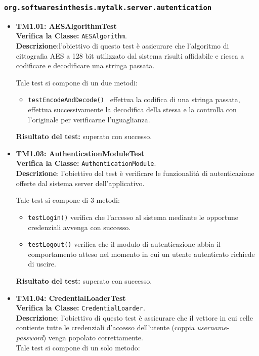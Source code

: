 \subsubsection{\texttt{org.softwaresinthesis.mytalk.server.autentication}}
\begin{itemize}
\item \textbf{TM1.01: AESAlgorithmTest}\\
\textbf{Verifica la Classe:} \texttt{AESAlgorithm}.\\
\textbf{Descrizione}:l'obiettivo di questo test è assicurare che l'algoritmo di cittografia AES a 128 bit utilizzato dal sistema \caName{} risulti affidabile e riesca a codificare e decodificare una stringa passata.

Tale test si compone di un due metodi:
\begin{itemize}
\item \texttt{testEncodeAndDecode() } effettua la codifica di una stringa passata, effettua successivamente la decodifica della stessa e la controlla con l'originale per verificarne l'uguaglianza.
\end{itemize}
\textbf{Risultato del test:} superato con successo.

\begin{table}
\end{table}

\item \textbf{TM1.03: AuthenticationModuleTest}\\
\textbf{Verifica la Classe:} \texttt{AuthenticationModule}.\\
\textbf{Descrizione}: l'obiettivo del test è verificare le funzionalità di autenticazione offerte dal sistema server dell'applicativo.

Tale test si compone di 3 metodi:
\begin{itemize}
\item \texttt{testLogin()} verifica che l'accesso al sistema mediante le opportune credenziali avvenga con successo.
\item \texttt{testLogout()} verifica che il modulo di autenticazione abbia il comportamento atteso nel momento in cui un utente autenticato richiede di uscire.
\end{itemize}
\textbf{Risultato del test:} superato con successo.

\begin{table}
\end{table}

\item \textbf{TM1.04: CredentialLoaderTest}\\
\textbf{Verifica la Classe:} \texttt{CredentialLoarder}.\\
\textbf{Descrizione}: l'obiettivo di questo test è assicurare che il vettore in cui celle contiente tutte le credenziali d'accesso dell'utente (coppia \textit{username-password}) venga popolato correttamente.\\
Tale test si compone di un solo metodo:
\begin{itemize}


\end{itemize}
\end{itemize}
